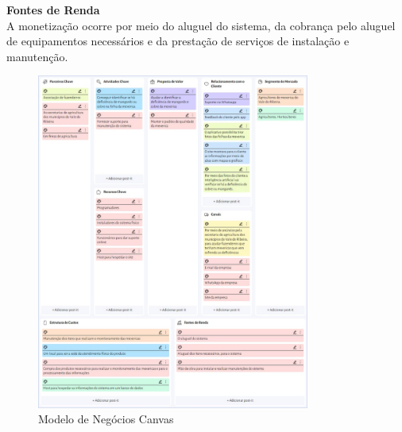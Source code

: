 \medskip
\noindent\textbf{Fontes de Renda}\\
A monetização ocorre por meio do aluguel do sistema, da cobrança pelo aluguel de equipamentos necessários e da prestação de serviços de instalação e manutenção.
\medskip

\begin{figure}[H]
\centering
\caption{Modelo de Negócios Canvas}
\label{fig:Canvas}
\includegraphics[width=0.8\textwidth]{Images/Canvas.jpeg}
\end{figure}
\medskip